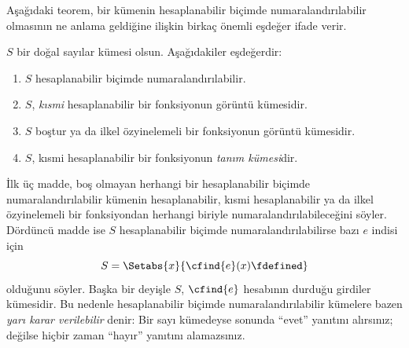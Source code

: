 



Aşağıdaki teorem, bir kümenin hesaplanabilir biçimde numaralandırılabilir
olmasının ne anlama geldiğine ilişkin birkaç önemli eşdeğer ifade verir.

\begin{thm}
$S$ bir doğal sayılar kümesi olsun. Aşağıdakiler eşdeğerdir:
\begin{enumerate}
\item{} $S$ hesaplanabilir biçimde numaralandırılabilir.
\item{} $S$, \emph{kısmi} hesaplanabilir bir fonksiyonun
  görüntü kümesidir.
\item{} $S$ boştur ya da ilkel özyinelemeli bir
  fonksiyonun görüntü kümesidir.
\item{} $S$, kısmi hesaplanabilir bir fonksiyonun
  \emph{tanım kümesi}dir.
\end{enumerate}
\end{thm}

\begin{explain}
İlk üç madde, boş olmayan herhangi bir hesaplanabilir biçimde
numaralandırılabilir kümenin hesaplanabilir, kısmi hesaplanabilir ya da ilkel
özyinelemeli bir fonksiyondan herhangi biriyle numaralandırılabileceğini
söyler. Dördüncü madde ise $S$ hesaplanabilir biçimde
numaralandırılabilirse bazı $e$ indisi için
\[
  S=\Setabs{x}{\cfind{e}(x)\fdefined}
\]
olduğunu söyler. Başka bir deyişle $S$, $\cfind{e}$ hesabının durduğu
girdiler kümesidir. Bu nedenle hesaplanabilir biçimde numaralandırılabilir
kümelere bazen \emph{yarı karar verilebilir} denir: Bir sayı kümedeyse
sonunda ``evet'' yanıtını alırsınız; değilse hiçbir zaman ``hayır'' yanıtını
alamazsınız.
\end{explain}

